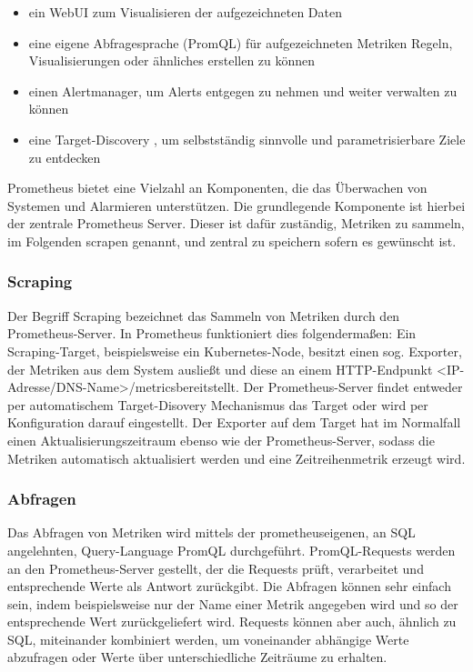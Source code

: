 \documentclass[a4paper,10pt]{scrartcl}
\begin{document}
\begin{itemize} 
\item ein WebUI zum Visualisieren der aufgezeichneten Daten
\item eine eigene Abfragesprache (PromQL) für aufgezeichneten Metriken Regeln, Visualisierungen oder ähnliches erstellen zu können
\item einen Alertmanager, um Alerts entgegen zu nehmen und weiter verwalten zu können
\item eine \glqq Target-Discovery \grqq, um selbstständig sinnvolle und parametrisierbare Ziele zu entdecken

\end{itemize}

Prometheus bietet eine Vielzahl an Komponenten, die das Überwachen von Systemen und Alarmieren unterstützen. Die grundlegende Komponente ist hierbei der zentrale Prometheus Server. Dieser ist dafür zuständig, Metriken zu sammeln, im Folgenden scrapen genannt, und zentral zu speichern sofern es gewünscht ist.

\subsubsection{Scraping}

Der Begriff Scraping bezeichnet das Sammeln von Metriken durch den Prometheus-Server. In Prometheus funktioniert dies folgendermaßen:
Ein Scraping-Target, beispielsweise ein Kubernetes-Node, besitzt einen sog. Exporter, der Metriken aus dem System ausließt und diese an einem HTTP-Endpunkt \glqq<IP-Adresse/DNS-Name>/metrics\grqq bereitstellt. Der Prometheus-Server findet entweder per automatischem Target-Disovery Mechanismus das Target oder wird per Konfiguration darauf eingestellt.
Der Exporter auf dem Target hat im Normalfall einen Aktualisierungszeitraum ebenso wie der Prometheus-Server, sodass die Metriken automatisch aktualisiert werden und eine Zeitreihenmetrik erzeugt wird.

\subsubsection{Abfragen}

Das Abfragen von Metriken wird mittels der prometheuseigenen, an SQL angelehnten, Query-Language PromQL durchgeführt. PromQL-Requests werden an den Prometheus-Server gestellt, der die Requests prüft, verarbeitet und entsprechende Werte als Antwort zurückgibt. Die Abfragen können sehr einfach sein, indem beispielsweise nur der Name einer Metrik angegeben wird und so der entsprechende Wert zurückgeliefert wird. Requests können aber auch, ähnlich zu SQL, miteinander kombiniert werden, um voneinander abhängige Werte abzufragen oder Werte über unterschiedliche Zeiträume zu erhalten.\\
\end{document}
